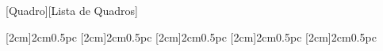 [Quadro][Lista de Quadros] %

\usepackage{tocbasic} %


        
\newcommand\entrynumberwithprefix[2]{#1\enspace#2-\enspace}
\captionsetup{labelsep=endash} %

\usepackage{tocloft} %

\renewcommand{\cfttoctitlefont}{\hspace*{\fill}\normalsize\bfseries\MakeUppercase}
\renewcommand{\cftaftertoctitle}{\hspace*{\fill}}
\renewcommand{\cftlottitlefont}{\hspace*{\fill}\normalsize\bfseries\MakeUppercase}
\renewcommand{\cftafterlottitle}{\hspace*{\fill}}
\renewcommand{\cftloftitlefont}{\hspace*{\fill}\normalsize\bfseries\MakeUppercase}
\renewcommand{\cftafterloftitle}{\hspace*{\fill}}


\usepackage{titletoc} %
[2cm]{\bfseries}{2cm}{0.5pc}
[2cm]{}{2cm}{0.5pc}
[2cm]{\bfseries}{2cm}{0.5pc}
[2cm]{\itshape}{2cm}{0.5pc}
[2cm]{}{2cm}{0.5pc}
\renewcommand{\contentsname}{\centering Contents}



\usepackage{listingsutf8}
\usepackage[dvipsnames]{xcolor}
\usepackage{empheq} 

\newcommand{\boxedeq}[2]{\begin{empheq}[box={\fboxsep=6pt\fbox}]{align}\notag#2\end{empheq}}

